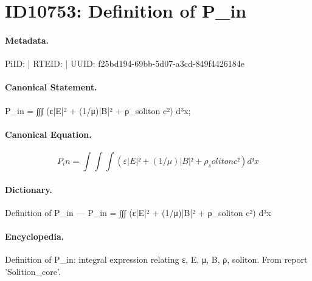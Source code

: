 \section*{ID10753: Definition of P\_in}
\paragraph{Metadata.}
PiID:  | RTEID:  | UUID: f25bd194-69bb-5d07-a3cd-849f4426184e

\paragraph{Canonical Statement.}
P\_in = ∫∫∫ (ε|E|² + (1/μ)|B|² + ρ\_soliton c²) d³x;

\paragraph{Canonical Equation.}
\[
P_in = ∫∫∫ (ε|E|² + (1/μ)|B|² + ρ_soliton c²) d³x
\]

\paragraph{Dictionary.}
Definition of P\_in — P\_in = ∫∫∫ (ε|E|² + (1/μ)|B|² + ρ\_soliton c²) d³x

\paragraph{Encyclopedia.}
Definition of P\_in: integral expression relating ε, E, μ, B, ρ, soliton. From report 'Solition\_core'.
